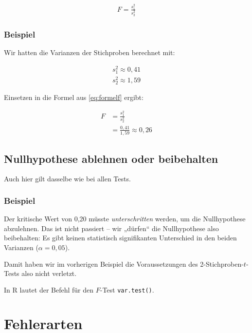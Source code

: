 \documentclass[
  11pt,
  ngerman,
  a4paper,
]{report}
\newenvironment{rtip}{
  \medskip
  \begin{tcolorbox}[colframe=purple,colback=light_gray,title=Softwarehinweis]
}{
  \end{tcolorbox}
  \medskip
}
\begin{document}
\[\begin{aligned}
F=\frac{s^2_1}{s^2_2}
\end{aligned}
\label{eq:formelf}\]

\hypertarget{beispiel-21}{%
\subsubsection{Beispiel}\label{beispiel-21}}

Wir hatten die Varianzen der Stichproben berechnet mit:

\[\begin{aligned}
s^2_1\approx0{,}41\\
s^2_2\approx1{,}59
\end{aligned}\]

Einsetzen in die Formel aus \eqref{eq:formelf} ergibt:

\[\begin{aligned}
F&=\frac{s^2_1}{s^2_2}\\[6pt]
&=\frac{0{,}41}{1{,}59}\approx0{,}26
\end{aligned}\]

\hypertarget{nullhypothese-ablehnen-oder-beibehalten}{%
\subsection{Nullhypothese ablehnen oder beibehalten}\label{nullhypothese-ablehnen-oder-beibehalten}}

Auch hier gilt dasselbe wie bei allen Tests.

\hypertarget{beispiel-22}{%
\subsubsection{Beispiel}\label{beispiel-22}}

Der kritische Wert von 0,20 müsste \emph{unterschritten} werden, um die Nullhypothese abzulehnen. Das ist nicht passiert -- wir „dürfen`` die Nullhypothese also beibehalten: Es gibt keinen statistisch signifikanten Unterschied in den beiden Varianzen (\(\alpha=0{,}05\)).

Damit haben wir im vorherigen Beispiel die Voraussetzungen des 2-Stichproben-\(t\)-Tests also nicht verletzt.

\begin{rtip}
In R lautet der Befehl für den $F$-Test \verb|var.test()|.
\end{rtip}

\hypertarget{fehlerarten}{%
\section{Fehlerarten}\label{fehlerarten}}
\end{document}
